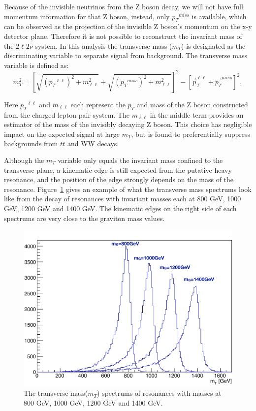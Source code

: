 \vspace{0.3cm}
Because of the invisible neutrinos from the Z boson decay, we will not have full momentum information for that Z boson, instead, only ${p_{T}}^{miss}$ is available, which can be observed as the projection of the invisible Z boson's momentum on the x-y detector plane. Therefore it is not possible to reconstruct the invariant mass of the $2\ell 2\nu$ system. In this analysis the transverse mass ($m_{T}$) is designated as the discriminating variable to separate signal from background. The transverse mass variable is defined as:
\begin{equation}
m_{T}^2 = \left[ \sqrt{({p_{T}}^{\ell\ell})^2 + m^2_{\ell\ell}}
      + \sqrt{({p_{T}}^{miss})^2+m^2_{\ell\ell}}\right]^2
      - \left[\vec{p}_{T}^{\ell\ell}+\vec{p_{T}}^{miss}\right]^2,
\label{eqn:intro_MT}
\end{equation}

Here ${p_{T}}^{\ell\ell}$ and $m_{\ell\ell}$ each represent the $p_{T}$ and mass of the Z boson constructed from the charged lepton pair system. The $m_{\ell\ell}$ in the middle term provides an estimator of the mass of the invisibly decaying Z boson. This choice has negligible impact on the expected signal at large $m_{T}$, but is found to preferentially suppress backgrounds from $t\bar{t}$ and WW decays.

\vspace{0.3cm}
Although the $m_{T}$ variable only equals the invariant mass confined to the transverse plane, a kinematic edge is still expected from the putative heavy resonance, and the position of the edge strongly depends on the mass of the resonance. Figure~\ref{fig:intro_mt} gives an example of what the transverse mass spectrums look like from the decay of resonances with invariant masses each at 800 GeV, 1000 GeV, 1200 GeV and 1400 GeV. The kinematic edges on the right side of each spectrums are very close to the graviton mass values.

\begin{figure}[htbp]
\begin{center}
\includegraphics[width=0.72\linewidth]{figures/intro_example_mt.pdf}
\caption{The transverse mass($m_{T}$) spectrums of resonances with masses at 800 GeV, 1000 GeV, 1200 GeV and 1400 GeV.}
\label{fig:intro_mt}
\end{center}
\end{figure}


